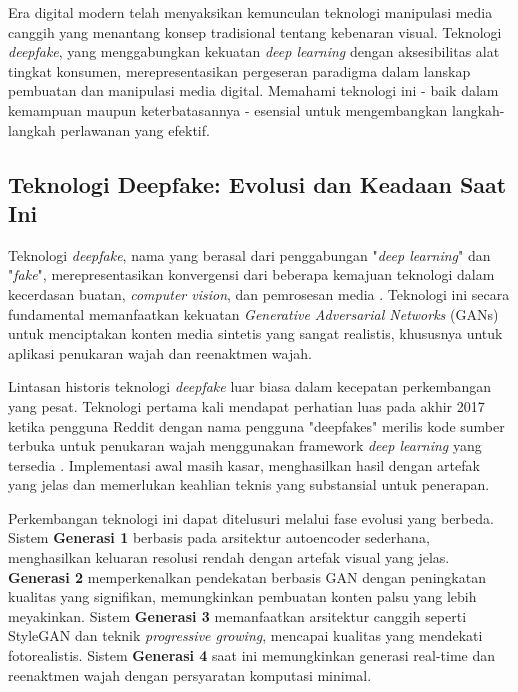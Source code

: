 Era digital modern telah menyaksikan kemunculan teknologi manipulasi media canggih yang menantang konsep tradisional tentang kebenaran visual. Teknologi \textit{deepfake}, yang menggabungkan kekuatan \textit{deep learning} dengan aksesibilitas alat tingkat konsumen, merepresentasikan pergeseran paradigma dalam lanskap pembuatan dan manipulasi media digital. Memahami teknologi ini - baik dalam kemampuan maupun keterbatasannya - esensial untuk mengembangkan langkah-langkah perlawanan yang efektif.

\subsection{Teknologi Deepfake: Evolusi dan Keadaan Saat Ini}

Teknologi \textit{deepfake}, nama yang berasal dari penggabungan "\textit{deep learning}" dan "\textit{fake}", merepresentasikan konvergensi dari beberapa kemajuan teknologi dalam kecerdasan buatan, \textit{computer vision}, dan pemrosesan media \cite{rana2022deepfake}. Teknologi ini secara fundamental memanfaatkan kekuatan \textit{Generative Adversarial Networks} (GANs) untuk menciptakan konten media sintetis yang sangat realistis, khususnya untuk aplikasi penukaran wajah dan reenaktmen wajah.

Lintasan historis teknologi \textit{deepfake} luar biasa dalam kecepatan perkembangan yang pesat. Teknologi pertama kali mendapat perhatian luas pada akhir 2017 ketika pengguna Reddit dengan nama pengguna "deepfakes" merilis kode sumber terbuka untuk penukaran wajah menggunakan framework \textit{deep learning} yang tersedia \cite{ajder2019deepfakes}. Implementasi awal masih kasar, menghasilkan hasil dengan artefak yang jelas dan memerlukan keahlian teknis yang substansial untuk penerapan.

Perkembangan teknologi ini dapat ditelusuri melalui fase evolusi yang berbeda. Sistem \textbf{Generasi 1} berbasis pada arsitektur autoencoder sederhana, menghasilkan keluaran resolusi rendah dengan artefak visual yang jelas. \textbf{Generasi 2} memperkenalkan pendekatan berbasis GAN dengan peningkatan kualitas yang signifikan, memungkinkan pembuatan konten palsu yang lebih meyakinkan. Sistem \textbf{Generasi 3} memanfaatkan arsitektur canggih seperti StyleGAN dan teknik \textit{progressive growing}, mencapai kualitas yang mendekati fotorealistis. Sistem \textbf{Generasi 4} saat ini memungkinkan generasi real-time dan reenaktmen wajah dengan persyaratan komputasi minimal.

